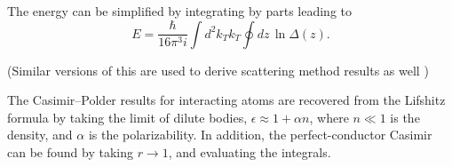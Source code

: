 The energy can be simplified by integrating by parts leading to 
\begin{equation}
  E = \frac{\hbar}{16\pi^3 i}\int d^2k_Tk_T\oint dz \, \ln\Delta(z).
\end{equation}
\begin{itemize}

\end{itemize}
(Similar versions of this are used to derive scattering method results as well )


The Casimir--Polder results for interacting atoms are recovered from the Lifshitz formula by taking the limit of dilute bodies,
$\epsilon \approx 1+\alpha n$, where $n\ll 1$ is the density, and $\alpha$ is the polarizability.
In addition, the perfect-conductor Casimir can be found by taking $r\rightarrow 1$, and evaluating the 
integrals.

